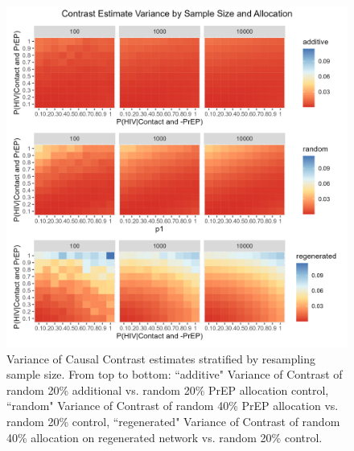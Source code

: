 \documentclass{article}
\theoremstyle{definition}
\begin{document}
\begin{figure}[H]
    \centering
    \includegraphics[scale=0.8]{Figures/Sample Size Variance plots.png}
    \caption{Variance of Causal Contrast estimates stratified by resampling sample size. From top to bottom: ``additive" Variance of Contrast of random 20\% additional vs. random 20\% PrEP allocation control, ``random" Variance of Contrast of random 40\% PrEP allocation vs. random 20\% control, ``regenerated" Variance of Contrast of random 40\% allocation on regenerated network vs. random 20\% control.}
    \label{fig:Figure 10}
\end{figure}
\end{document}
